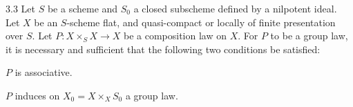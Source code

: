 \begin{proposition}{3.3}\label{III.3.3}
Let \(S\) be a scheme and \(S_{0}\) a closed subscheme defined by a nilpotent
ideal. Let \(X\) be an \(S\)-scheme flat, and quasi-compact or locally of finite
presentation over \(S\). Let \(P\colon X\times_{S}X\to X\) be a composition law
on \(X\). For \(P\) to be a group law, it is necessary and sufficient that the
following two conditions be satisfied:
\begin{enumeratei}
\item \(P\) is associative.
\item \(P\) induces on \(X_{0}=X\times_{X}S_{0}\) a group law.
\end{enumeratei}
\end{proposition}


